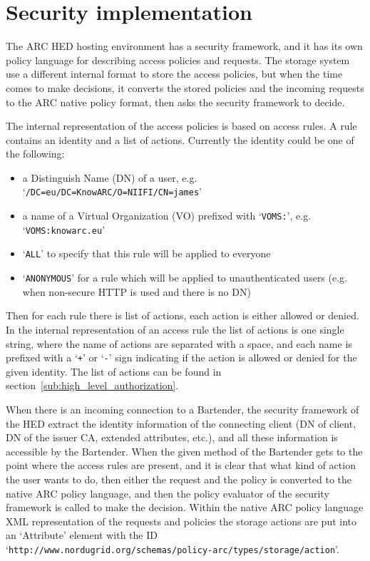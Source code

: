 \documentclass{book}
\begin{document}



\section{Security implementation} %
\label{sec:security_implementation}

The ARC HED hosting environment has a security framework, and it has its own policy language for describing access policies and requests. The storage system use a different internal format to store the access policies, but when the time comes to make decisions, it converts the stored policies and the incoming requests to the ARC native policy format, then asks the security framework to decide.

The internal representation of the access policies is based on access rules. A rule contains an identity and a list of actions. Currently the identity could be one of the following:
\begin{itemize}
    \item a Distinguish Name (DN) of a user, e.g. `\verb!/DC=eu/DC=KnowARC/O=NIIFI/CN=james!'
    \item a name of a Virtual Organization (VO) prefixed with `\verb!VOMS:!', e.g. `\verb!VOMS:knowarc.eu!'
    \item `\verb!ALL!' to specify that this rule will be applied to everyone
    \item `\verb!ANONYMOUS!' for a rule which will be applied to unauthenticated users (e.g. when non-secure HTTP is used and there is no DN)
\end{itemize}

Then for each rule there is list of actions, each action is either allowed or denied. In the internal representation of an access rule the list of actions is one single string, where the name of actions are separated with a space, and each name is prefixed with a `\verb!+!' or `\verb!-!' sign indicating if the action is allowed or denied for the given identity. The list of actions can be found in section~\ref{sub:high_level_authorization}.

When there is an incoming connection to a Bartender, the security framework of the HED extract the identity information of the connecting client (DN of client, DN of the issuer CA, extended attributes, etc.), and all these information is accessible by the Bartender. When the given method of the Bartender gets to the point where the access rules are present, and it is clear that what kind of action the user wants to do, then either the request and the policy is converted to the native ARC policy language, and then the policy evaluator of the security framework is called to make the decision. Within the native ARC policy language XML representation of the requests and policies the storage actions are put into an `Attribute' element with the ID `\verb!http://www.nordugrid.org/schemas/policy-arc/types/storage/action!'.
\end{document}
